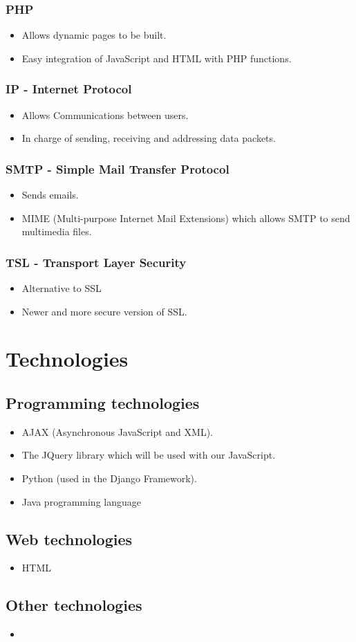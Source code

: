 \documentclass[12pt, oneside]{article}
\begin{document}
		\subsubsection{PHP}
			\begin{itemize}
				\item Allows dynamic pages to be built.
				\item Easy integration of JavaScript and HTML with PHP functions.
			\end{itemize}
		\subsubsection{IP - Internet Protocol}	
			\begin{itemize}
				\item Allows Communications between users.
				\item In charge of sending, receiving and addressing data packets.
			\end{itemize}				
		\subsubsection{SMTP - Simple Mail Transfer Protocol}
			\begin{itemize}
				\item Sends emails.
				\item MIME (Multi-purpose Internet Mail Extensions) which allows SMTP to send multimedia files.
			\end{itemize}
		\subsubsection{TSL - Transport Layer Security}
			\begin{itemize}
				\item Alternative to SSL
				\item Newer and more secure version of SSL.
			\end{itemize}
		
\section{Technologies}
	\subsection{Programming technologies}
		\begin{itemize}
			\item AJAX (Asynchronous JavaScript and XML).
			\item The JQuery library which will be used with our JavaScript.
			\item Python (used in the Django Framework).
			\item Java programming language 
		\end{itemize}
	\subsection{Web technologies}
		\begin{itemize}
			\item HTML
		\end{itemize}
	\subsection{Other technologies}
		\begin{itemize}
			\item
		\end{itemize}
\end{document}
